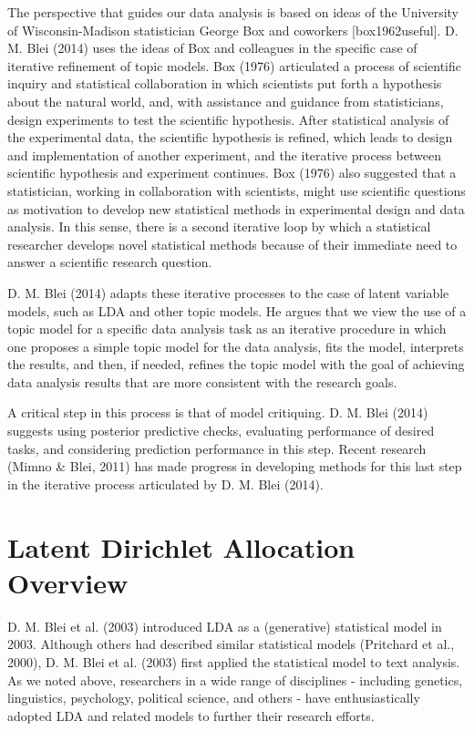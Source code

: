 \documentclass[12pt,]{article}
\begin{document}
The perspective that guides our data analysis is based on ideas of the
University of Wisconsin-Madison statistician George Box and coworkers
{[}box1962useful{]}. D. M. Blei (2014) uses the ideas of Box and
colleagues in the specific case of iterative refinement of topic models.
Box (1976) articulated a process of scientific inquiry and statistical
collaboration in which scientists put forth a hypothesis about the
natural world, and, with assistance and guidance from statisticians,
design experiments to test the scientific hypothesis. After statistical
analysis of the experimental data, the scientific hypothesis is refined,
which leads to design and implementation of another experiment, and the
iterative process between scientific hypothesis and experiment
continues. Box (1976) also suggested that a statistician, working in
collaboration with scientists, might use scientific questions as
motivation to develop new statistical methods in experimental design and
data analysis. In this sense, there is a second iterative loop by which
a statistical researcher develops novel statistical methods because of
their immediate need to answer a scientific research question.

D. M. Blei (2014) adapts these iterative processes to the case of latent
variable models, such as LDA and other topic models. He argues that we
view the use of a topic model for a specific data analysis task as an
iterative procedure in which one proposes a simple topic model for the
data analysis, fits the model, interprets the results, and then, if
needed, refines the topic model with the goal of achieving data analysis
results that are more consistent with the research goals.

A critical step in this process is that of model critiquing. D. M. Blei
(2014) suggests using posterior predictive checks, evaluating
performance of desired tasks, and considering prediction performance in
this step. Recent research (Mimno \& Blei, 2011) has made progress in
developing methods for this last step in the iterative process
articulated by D. M. Blei (2014).

\section{Latent Dirichlet Allocation
Overview}\label{latent-dirichlet-allocation-overview}

D. M. Blei et al. (2003) introduced LDA as a (generative) statistical
model in 2003. Although others had described similar statistical models
(Pritchard et al., 2000), D. M. Blei et al. (2003) first applied the
statistical model to text analysis. As we noted above, researchers in a
wide range of disciplines - including genetics, linguistics, psychology,
political science, and others - have enthusiastically adopted LDA and
related models to further their research efforts.
\end{document}
